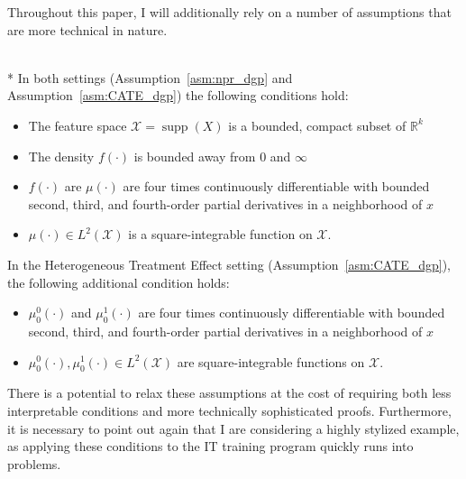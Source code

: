 Throughout this paper, I will additionally rely on a number of assumptions that are more technical in nature.
\begin{boxD}
	\begin{asm}\label{asm:technical}\mbox{}\\*
		In both settings (Assumption~\ref{asm:npr_dgp} and Assumption~\ref{asm:CATE_dgp}) the following conditions hold:
		\begin{itemize}
			\item The feature space $\mathcal{X} = \operatorname{supp}(X)$ is a bounded, compact subset of $\mathbb{R}^k$
			\item The density $f(\cdot)$ is bounded away from 0 and $\infty$
			\item $f(\cdot)$ are $\mu(\cdot)$ are four times continuously differentiable with bounded second, third, and fourth-order partial derivatives in a neighborhood of $x$
            \item $\mu(\cdot) \in L^{2}\left(\mathcal{X}\right)$ is a square-integrable function on $\mathcal{X}$.
		\end{itemize}
		In the Heterogeneous Treatment Effect setting (Assumption~\ref{asm:CATE_dgp}), the following additional condition holds:
		\begin{itemize}
			\item $\mu_{0}^{0}(\cdot)$ and $\mu_{0}^{1}(\cdot)$ are four times continuously differentiable with bounded second, third, and fourth-order partial derivatives in a neighborhood of $x$
            \item $\mu_{0}^{0}(\cdot), \mu_{0}^{1}(\cdot) \in L^{2}\left(\mathcal{X}\right)$ are square-integrable functions on $\mathcal{X}$.
		\end{itemize}
	\end{asm}
\end{boxD}
There is a potential to relax these assumptions at the cost of requiring both less interpretable conditions and more technically sophisticated proofs.
Furthermore, it is necessary to point out again that I are considering a highly stylized example, as applying these conditions to the IT training program quickly runs into problems.
